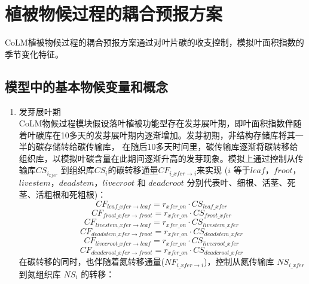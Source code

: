 \section{植被物候过程的耦合预报方案}\label{植被物候过程的耦合预报方案}
CoLM植被物候过程的耦合预报方案通过对叶片碳的收支控制，模拟叶面积指数的季节变化特征。


\subsection{模型中的基本物候变量和概念}\label{模型中的基本物候变量和概念}

\begin{enumerate}
\renewcommand{\theenumi}{\alph{enumi}}
\item 发芽展叶期\\
CoLM物候过程模块假设落叶植被功能型存在发芽展叶期，即叶面积指数伴随着叶碳库在10多天的发芽展叶期内逐渐增加。发芽初期，非结构存储库将其一半的碳存储转给碳传输库，
在随后10多天时间里，碳传输库逐渐将碳转移给组织库，以模拟叶碳含量在此期间逐渐升高的发芽现象。模拟上通过控制从传输库$CS_{i_{xfer}}$
到组织库$CS_i$的碳转移通量$CF_{i\_xfer\rightarrow i}$来实现
($i$ 等于$leaf$，$froot$，$livestem$，$deadstem$，$livecroot$ 和
$deadcroot$ 分别代表叶、细根、活茎、死茎、活粗根和死粗根)：
\begin{equation}
  CF_{leaf\_xfer\rightarrow leaf} = r_{{xfer}\_{on}}\cdot CS_{leaf\_{xfer}}\ 
\end{equation}
\begin{equation}
  CF_{froot\_{xfer}\rightarrow froot} = r_{{xfer}\_{on}}\cdot CS_{froot\_{xfer}}\ 
\end{equation}
\begin{equation}
  CF_{livestem\_{xfer}\rightarrow leaf} = r_{{xfer}\_{on}}\cdot CS_{livestem\_{xfer}}\ 
\end{equation}
\begin{equation}
  CF_{deadstem\_{xfer}\rightarrow froot} = r_{{xfer}\_{on}}\cdot CS_{deadstem\_{xfer}}\ 
\end{equation}
\begin{equation}
  CF_{livecroot\_{xfer}\rightarrow leaf} = r_{{xfer}\_{on}}\cdot CS_{livecroot\_{xfer}}\ 
\end{equation}
\begin{equation}
  CF_{deadcroot\_{xfer}\rightarrow froot} = r_{{xfer}\_{on}}\cdot CS_{deadcroot\_{xfer}}\ 
\end{equation}
在碳转移的同时，也伴随着氮转移通量($NF_{i\_{xfer}\rightarrow i}$)，控制从氮传输库 $NS_{i\_{xfer}}$ 到氮组织库 $NS_{i}$ 的转移：

\end{enumerate}
